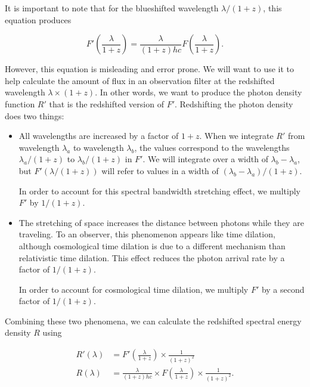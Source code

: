 \documentclass[linenumbers]{aastex631}
\begin{document}
It is important to note that for the blueshifted wavelength $\lambda / (1+z)$,
this equation produces

\begin{equation}
 F'\left(\frac{\lambda}{1+z}\right) = \frac{\lambda}{(1+z)hc} F\left(\frac{\lambda}{1+z}\right).
\end{equation}

\noindent However, this equation is misleading and error prone. We will want to
use it to help calculate the amount of flux in an observation filter at the
redshifted wavelength $\lambda \times (1 + z)$. In other words, we want to
produce the photon density function $R'$ that is the redshifted version of
$F'$. Redshifting the photon density does two things:

\begin{itemize}
  \item All wavelengths are increased by a factor of $1 + z$. When we integrate
  $R'$ from wavelength $\lambda_a$ to wavelength $\lambda_b$, the values
  correspond to the wavelengths $\lambda_a / (1+z)$ to $\lambda_b / (1+z)$ in
  $F'$. We will integrate over a width of $\lambda_b - \lambda_a$, but
  $F'(\lambda / (1+z))$ will refer to values in a width of
  $(\lambda_b - \lambda_a) / (1+z)$.

  In order to account for this spectral bandwidth stretching effect, we
  multiply $F'$ by $1/(1+z)$.

  \item The stretching of space increases the distance between photons while
  they are traveling. To an observer, this phenomenon appears like time
  dilation, although cosmological time dilation is due to a different mechanism
  than relativistic time dilation. This effect reduces the photon arrival rate
  by a factor of $1/(1+z)$.

  In order to account for cosmological time dilation, we multiply $F'$ by a
  second factor of $1/(1+z)$.
\end{itemize}

Combining these two phenomena, we can calculate the redshifted spectral energy
density $R$ using

\begin{equation}
\begin{aligned}
\label{eq:redshifted_density}
  R'(\lambda) &= F'\left(\frac{\lambda}{1+z}\right) \times \frac{1}{(1 + z)^2} \\
  R(\lambda) &= \frac{\lambda}{(1+z)hc} \times F\left(\frac{\lambda}{1+z}\right) \times \frac{1}{(1 + z)^2} .
\end{aligned}
\end{equation}
\end{document}
